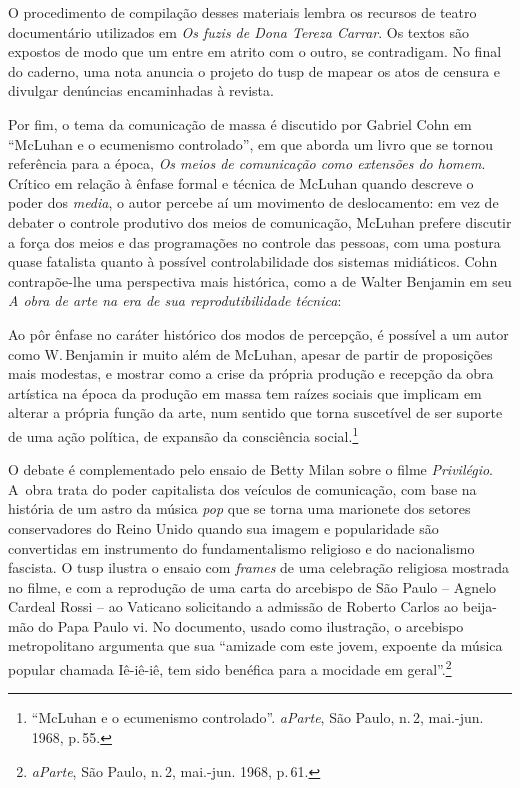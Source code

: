 {O procedimento de compilação desses materiais lembra os recursos de
teatro documentário utilizados em {\it Os fuzis de Dona Tereza Carrar}.
Os textos são expostos de modo que um entre em atrito com o outro,
se contradigam. No final do caderno, uma nota anuncia o projeto do
{\sc tusp} de mapear os atos de censura e divulgar denúncias encaminhadas à
revista.

Por fim, o tema da comunicação de massa é discutido por Gabriel Cohn em
“McLuhan e o ecumenismo controlado”, em que aborda um
livro que se tornou referência para a época, {\it Os meios de comunicação como extensões do homem}.
Crítico em relação à ênfase formal e técnica de McLuhan quando descreve
o poder dos {\it media}, o autor percebe aí um movimento de
deslocamento: em vez de debater o controle produtivo dos meios de
comunicação, McLuhan prefere discutir a força dos meios e das
programações no controle das pessoas, com uma postura quase fatalista
quanto à possível controlabilidade dos sistemas midiáticos. Cohn
contrapõe-lhe uma perspectiva mais histórica, como a de Walter
Benjamin em seu {\it A obra de arte na era de sua reprodutibilidade
técnica}:

\startblockquote
Ao pôr ênfase no caráter histórico dos modos de percepção, é possível a
um autor como W.\,Benjamin ir muito além de McLuhan, apesar de partir de
proposições mais modestas, e mostrar como a crise da própria produção e
recepção da obra artística na época da produção em massa tem raízes
sociais que implicam em alterar a própria função da arte, num sentido
que torna suscetível de ser suporte de uma ação política, de expansão da
consciência social.\footnote{“McLuhan e o ecumenismo controlado”.
  {\it aParte}, São Paulo, n.\,2, mai.-jun. 1968, p.\,55.}
\stopblockquote

O debate é complementado pelo ensaio de Betty Milan
sobre o filme {\it Privilégio}. A~obra trata do poder capitalista dos
veículos de comunicação, com base na história de um astro da música
{\it pop} que se torna uma marionete dos setores conservadores do Reino
Unido quando sua imagem e popularidade são convertidas em instrumento do
fundamentalismo religioso e do nacionalismo fascista. O {\sc tusp} ilustra o
ensaio com {\it frames} de uma celebração religiosa mostrada no filme, e
com a reprodução de uma carta do arcebispo de São Paulo -- Agnelo Cardeal
Rossi -- ao Vaticano solicitando a admissão de Roberto Carlos ao
beija-mão do Papa Paulo {\sc vi}. No documento, usado como ilustração, o
arcebispo metropolitano argumenta que sua “amizade com este jovem,
expoente da música popular chamada Iê-iê-iê, tem sido benéfica para a
mocidade em geral”.\footnote{{\it aParte}, São Paulo, n.\,2, mai.-jun.
  1968, p.\,61.}

}
